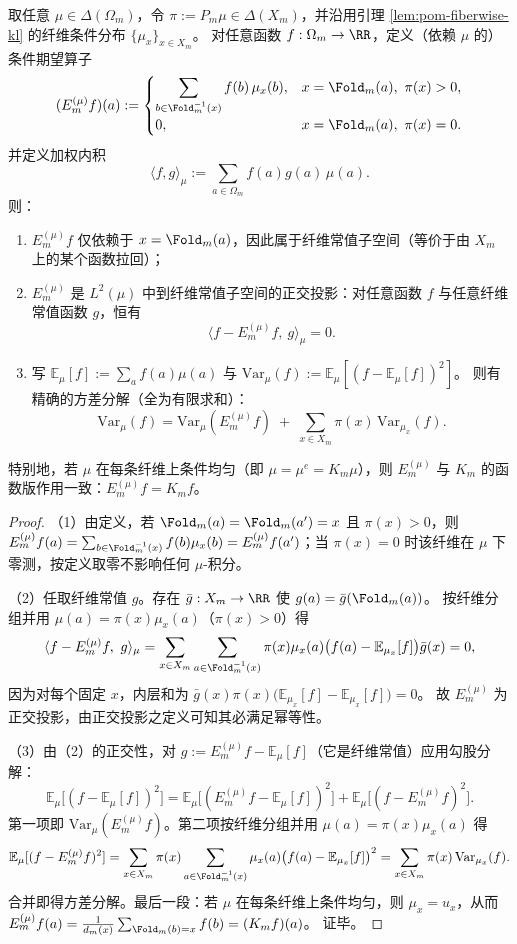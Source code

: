 \begin{proposition}\label{prop:pom-weighted-condexp-variance}
取任意 $\mu\in\Delta(\Omega_m)$，令 $\pi:=P_m\mu\in\Delta(X_m)$，并沿用引理 \ref{lem:pom-fiberwise-kl} 的纤维条件分布 $\{\mu_x\}_{x\in X_m}$。
对任意函数 $f:\Omega_m\to\RR$，定义（依赖 $\mu$ 的）条件期望算子
\[
(E_{m}^{(\mu)}f)(a):=
\begin{cases}
\displaystyle \sum_{b\in \Fold_m^{-1}(x)} f(b)\,\mu_x(b),& x=\Fold_m(a),\ \pi(x)>0,\\[6pt]
0,& x=\Fold_m(a),\ \pi(x)=0.
\end{cases}
\]
并定义加权内积
\[
\langle f,g\rangle_\mu:=\sum_{a\in\Omega_m} f(a)g(a)\,\mu(a).
\]
则：
\begin{enumerate}
  \item $E_m^{(\mu)}f$ 仅依赖于 $x=\Fold_m(a)$，因此属于纤维常值子空间（等价于由 $X_m$ 上的某个函数拉回）；
  \item $E_m^{(\mu)}$ 是 $L^2(\mu)$ 中到纤维常值子空间的正交投影：对任意函数 $f$ 与任意纤维常值函数 $g$，恒有
  \[
  \boxed{\;\langle f-E_m^{(\mu)}f,\ g\rangle_\mu=0.\;}
  \]
  \item 写
  \(
  \mathbb{E}_\mu[f]:=\sum_a f(a)\mu(a)
  \)
  与
  \(
  \mathrm{Var}_\mu(f):=\mathbb{E}_\mu[(f-\mathbb{E}_\mu[f])^2]
  \)。
  则有精确的方差分解（全为有限求和）：
  \[
  \boxed{\;
  \mathrm{Var}_\mu(f)=\mathrm{Var}_\mu(E_m^{(\mu)}f)\;+\;\sum_{x\in X_m}\pi(x)\,\mathrm{Var}_{\mu_x}(f).
  \;}
  \]
\end{enumerate}
特别地，若 $\mu$ 在每条纤维上条件均匀（即 $\mu=\mu^e=K_m\mu$），则 $E_m^{(\mu)}$ 与 $K_m$ 的函数版作用一致：$E_m^{(\mu)}f=K_m f$。
\end{proposition}
\begin{proof}
（1）由定义，若 $\Fold_m(a)=\Fold_m(a')=x$ 且 $\pi(x)>0$，则
\(
E_m^{(\mu)}f(a)=\sum_{b\in\Fold_m^{-1}(x)}f(b)\mu_x(b)=E_m^{(\mu)}f(a')
\)；当 $\pi(x)=0$ 时该纤维在 $\mu$ 下零测，按定义取零不影响任何 $\mu$-积分。

（2）任取纤维常值 $g$。存在 $\bar g:X_m\to\RR$ 使 $g(a)=\bar g(\Fold_m(a))$。
按纤维分组并用 $\mu(a)=\pi(x)\mu_x(a)$（$\pi(x)>0$）得
\[
\langle f-E_m^{(\mu)}f,\ g\rangle_\mu
=\sum_{x\in X_m}\sum_{a\in\Fold_m^{-1}(x)}\pi(x)\mu_x(a)\bigl(f(a)-\mathbb{E}_{\mu_x}[f]\bigr)\bar g(x)=0,
\]
因为对每个固定 $x$，内层和为
\(
\bar g(x)\pi(x)\bigl(\mathbb{E}_{\mu_x}[f]-\mathbb{E}_{\mu_x}[f]\bigr)=0
\)。
故 $E_m^{(\mu)}$ 为正交投影，由正交投影之定义可知其必满足幂等性。

（3）由（2）的正交性，对 $g:=E_m^{(\mu)}f-\mathbb{E}_\mu[f]$（它是纤维常值）应用勾股分解：
\[
\mathbb{E}_\mu\!\bigl[(f-\mathbb{E}_\mu[f])^2\bigr]
=\mathbb{E}_\mu\!\bigl[(E_m^{(\mu)}f-\mathbb{E}_\mu[f])^2\bigr]+\mathbb{E}_\mu\!\bigl[(f-E_m^{(\mu)}f)^2\bigr].
\]
第一项即 $\mathrm{Var}_\mu(E_m^{(\mu)}f)$。第二项按纤维分组并用 $\mu(a)=\pi(x)\mu_x(a)$ 得
\[
\mathbb{E}_\mu[(f-E_m^{(\mu)}f)^2]
=\sum_{x\in X_m}\pi(x)\sum_{a\in\Fold_m^{-1}(x)}\mu_x(a)\bigl(f(a)-\mathbb{E}_{\mu_x}[f]\bigr)^2
=\sum_{x\in X_m}\pi(x)\,\mathrm{Var}_{\mu_x}(f).
\]
合并即得方差分解。最后一段：若 $\mu$ 在每条纤维上条件均匀，则 $\mu_x=u_x$，从而
\(
E_m^{(\mu)}f(a)=\frac{1}{d_m(x)}\sum_{\Fold_m(b)=x}f(b)=(K_m f)(a)
\)。
证毕。
\end{proof}

